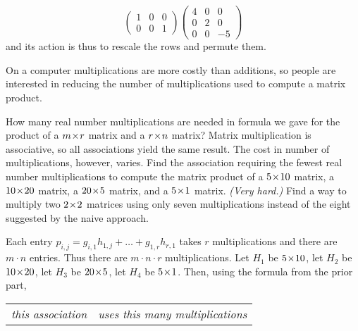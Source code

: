 \begin{exercises}
\begin{answer}
\begin{equation*}
\begin{pmatrix}
          1  &0  &0  \\
          0  &0  &1
        \end{pmatrix}
        \begin{pmatrix}
          4  &0  &0  \\
          0  &2  &0  \\
          0  &0  &-5
        \end{pmatrix}
      \end{equation*}
      and its action is thus to rescale the rows and permute them.
    \end{answer}
  \item 
    On a computer multiplications are more costly than additions, so
    people are interested in reducing the number of multiplications used to
    compute a matrix product.
    \begin{exparts}
      \partsitem How many real number multiplications are needed in formula 
        we gave for the product of a
        \( m \! \times \! r \) matrix and a \( r \! \times \! n \) matrix?
      \partsitem 
        Matrix multiplication is associative, so all associations yield
        the same result.
        The cost in number of multiplications, however, varies.
        Find the association requiring the fewest real number multiplications
        to compute the matrix product of
        a \( 5 \! \times \! 10 \) matrix,
        a \( 10 \! \times \! 20 \) matrix,
        a \( 20 \! \times \! 5 \) matrix, and
        a \( 5 \! \times \! 1 \) matrix.
      \partsitem \textit{(Very hard.)}
        Find a way to multiply two \( 2 \! \times \! 2 \) matrices using only seven
        multiplications instead of the eight suggested by the naive approach.
    \end{exparts}
    \begin{answer}
      \begin{exparts}
        \partsitem Each entry \(p_{i,j}=g_{i,1}h_{1,j}+\dots+g_{1,r}h_{r,1}  \)
          takes \( r \) multiplications and there are \( m\cdot n \) entries.
          Thus there are \( m\cdot n\cdot r \) multiplications.
        \partsitem Let \( H_1 \) be \( 5 \! \times \! 10 \),
           let \( H_2 \) be \( 10 \! \times \! 20 \),
           let \( H_3 \) be \( 20 \! \times \! 5 \),
           let \( H_4 \) be \( 5 \! \times \! 1 \).
           Then, using the formula from the prior part, 
           \begin{center}
             \begin{tabular}{l|l}
               \multicolumn{1}{c}{\textit{this association}}  
                &\multicolumn{1}{c}{\textit{uses this many multiplications}}\\ 

\end{tabular}
\end{center}
\end{exparts}
\end{answer}
\end{exercises}

